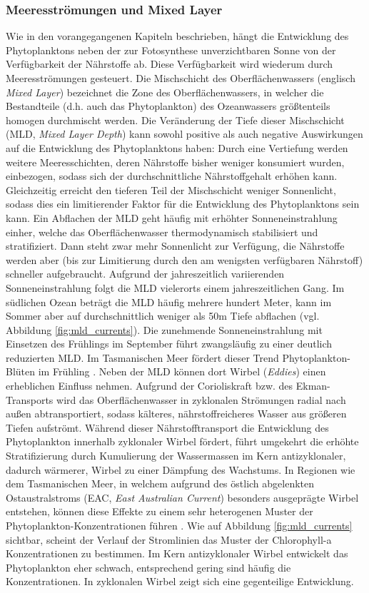 \documentclass[12pt,a4paper,onecolumn]{scrartcl}
\begin{document}
\subsubsection{Meeresströmungen und Mixed Layer}
Wie in den vorangegangenen Kapiteln beschrieben, hängt die Entwicklung des Phytoplanktons neben der zur Fotosynthese unverzichtbaren Sonne von der Verfügbarkeit der Nährstoffe ab. Diese Verfügbarkeit wird wiederum durch Meeresströmungen gesteuert. Die Mischschicht des Oberflächenwassers (englisch \textit{Mixed Layer}) bezeichnet die Zone des Oberflächenwassers, in welcher die Bestandteile (d.h. auch das Phytoplankton) des Ozeanwassers größtenteils homogen durchmischt werden. Die Veränderung der Tiefe dieser Mischschicht (MLD, \textit{Mixed Layer Depth}) kann sowohl positive als auch negative Auswirkungen auf die Entwicklung des Phytoplanktons haben: Durch eine Vertiefung werden weitere Meeresschichten, deren Nährstoffe bisher weniger konsumiert wurden, einbezogen, sodass sich der durchschnittliche Nährstoffgehalt erhöhen kann. Gleichzeitig erreicht den tieferen Teil der Mischschicht weniger Sonnenlicht, sodass dies ein limitierender Faktor für die Entwicklung des Phytoplanktons sein kann. Ein Abflachen der MLD geht häufig mit erhöhter Sonneneinstrahlung einher, welche das Oberflächenwasser thermodynamisch stabilisiert und stratifiziert. Dann steht zwar mehr Sonnenlicht zur Verfügung, die Nährstoffe werden aber (bis zur Limitierung durch den am wenigsten verfügbaren Nährstoff) schneller aufgebraucht. Aufgrund der jahreszeitlich variierenden Sonneneinstrahlung folgt die MLD vielerorts einem jahreszeitlichen Gang. Im südlichen Ozean beträgt die MLD häufig mehrere hundert Meter, kann im Sommer aber auf durchschnittlich weniger als 50m Tiefe abflachen (vgl. Abbildung \ref{fig:mld_currents}). Die zunehmende Sonneneinstrahlung mit Einsetzen des Frühlings im September führt zwangsläufig zu einer deutlich reduzierten MLD. Im Tasmanischen Meer fördert dieser Trend Phytoplankton-Blüten im Frühling \citep{Tilburg.2002}. Neben der MLD können dort Wirbel (\textit{Eddies}) einen erheblichen Einfluss nehmen. Aufgrund der Corioliskraft bzw. des Ekman-Transports wird das Oberflächenwasser in zyklonalen Strömungen radial nach außen abtransportiert, sodass kälteres, nährstoffreicheres Wasser aus größeren Tiefen aufströmt. Während dieser Nährstofftransport die Entwicklung des Phytoplankton innerhalb zyklonaler Wirbel fördert, führt umgekehrt die erhöhte Stratifizierung durch Kumulierung der Wassermassen im Kern antizyklonaler, dadurch wärmerer, Wirbel zu einer Dämpfung des Wachstums. In Regionen wie dem Tasmanischen Meer, in welchem aufgrund des östlich abgelenkten Ostaustralstroms (EAC, \textit{East Australian Current}) besonders ausgeprägte Wirbel entstehen, können diese Effekte zu einem sehr heterogenen Muster der Phytoplankton-Konzentrationen führen \citep{Tilburg.2002}. Wie auf Abbildung \ref{fig:mld_currents} sichtbar, scheint der Verlauf der Stromlinien das Muster der Chlorophyll-a Konzentrationen zu bestimmen. Im Kern antizyklonaler Wirbel entwickelt das Phytoplankton eher schwach, entsprechend gering sind häufig die Konzentrationen. In zyklonalen Wirbel zeigt sich eine gegenteilige Entwicklung.
\end{document}
